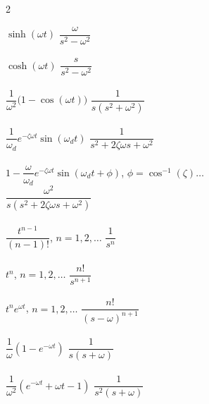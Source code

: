 \documentclass[12pt,letter]{article}
\begin{document}
{\begin{multicols}{2}
\begin{center}
\begin{tabbing}
	$\sinh (\omega t) $	\> $\dfrac{\omega}{s^2-\omega^2}$ \>\LTNUM \\ \\
	$\cosh (\omega t) $	\> $\dfrac{s}{s^2-\omega^2}$ \>\LTNUM \\ \\
	$\dfrac{1}{\omega^2}\big(1-\cos(\omega t)\big)$ \> $\dfrac{1}{s(s^2+\omega^2)}$ \>\LTNUM \\ \\
	$\dfrac{1}{\omega_d}e^{-\zeta \omega t}\sin(\omega_d t)$ \> $\dfrac{1}{s^2+2\zeta \omega s+\omega^2}$ \>\LTNUM \\ \\
	$1-\dfrac{\omega}{\omega_d}e^{-\zeta \omega t}\sin(\omega_d t + \phi)$, $\phi =\cos^{-1}(\zeta) \dots $ \\ \> $\dfrac{\omega^2}{s(s^2+2\zeta \omega s+\omega^2)}$ \>\LTNUM \\ \\
	$\dfrac{t^{n-1}}{(n-1)!}$, $ n=1,2,\dots $ \> $\dfrac{1}{s^n}$ \>\LTNUM \\ \\
	$t^n $, $n=1,2,\dots$     \> $\dfrac{n!}{s^{n+1}}$    \>\LTNUM \\ \\
	$t^ne^{\omega t}$, $ n=1,2,\dots $	\> $\dfrac{n!}{(s-\omega)^{n+1}}$	\>\LTNUM \\ \\
	$\dfrac{1}{\omega}(1-e^{-\omega t}) $	\> $\dfrac{1}{s(s+\omega)}$	\>\LTNUM \\ \\
	$\dfrac{1}{\omega^2}(e^{-\omega t}+\omega t - 1) $	\> $\dfrac{1}{s^2(s+\omega)}$	\>\LTNUM \\ \\
\end{tabbing}
\end{center}

\columnbreak


\end{multicols}}
\end{document}
